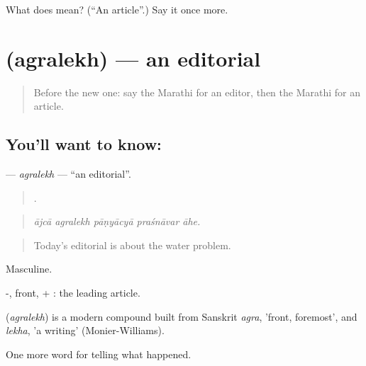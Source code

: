 \begin{tcolorbox}[breakable,colback=teal!4,colframe=teal!35!black,title={Before you move on}]
What does  mean? (\textquotedblleft{}An article\textquotedblright{}.) Say it once more.
\end{tcolorbox}
\section[\texorpdfstring{\mr{अग्रलेख} (agralekh)}{अग्रलेख (agralekh)}]{ (agralekh) — an editorial}

\label{lesson:MR-C311-agralekh}



\begin{quote}
Before the new one: say the Marathi for an editor, then the Marathi for an article.
\end{quote}

\subsection*{You'll want to know: }
\textbf{} — \emph{agralekh} — \textquotedblleft{}an editorial\textquotedblright{}.

\begin{quote}
    .
\end{quote}

\begin{quote}
\emph{ājcā agralekh pāṇyācyā praśnāvar āhe.}
\end{quote}

\begin{quote}
Today's editorial is about the water problem.
\end{quote}

Masculine.

-, front, + : the leading article.

\begin{cousinweb}
\textbf{} (\emph{agralekh}) is a modern compound built from Sanskrit \emph{agra}, 'front, foremost', and \emph{lekha}, 'a writing' (Monier-Williams).
\end{cousinweb}

\begin{grammarlens}[title={What you've built}]
One more word for telling what happened.
\end{grammarlens}

